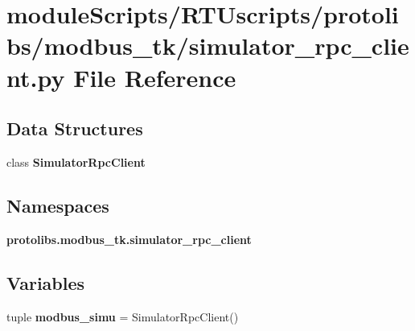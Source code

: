 \section{module\+Scripts/\+R\+T\+Uscripts/protolibs/modbus\+\_\+tk/simulator\+\_\+rpc\+\_\+client.py File Reference}
\label{modbus__tk_2simulator__rpc__client_8py}
\subsection*{Data Structures}
\begin{DoxyCompactItemize}
\item 
class {\bf Simulator\+Rpc\+Client}
\end{DoxyCompactItemize}
\subsection*{Namespaces}
\begin{DoxyCompactItemize}
\item 
 {\bf protolibs.\+modbus\+\_\+tk.\+simulator\+\_\+rpc\+\_\+client}
\end{DoxyCompactItemize}
\subsection*{Variables}
\begin{DoxyCompactItemize}
\item 
tuple {\bf modbus\+\_\+simu} = Simulator\+Rpc\+Client()
\end{DoxyCompactItemize}
